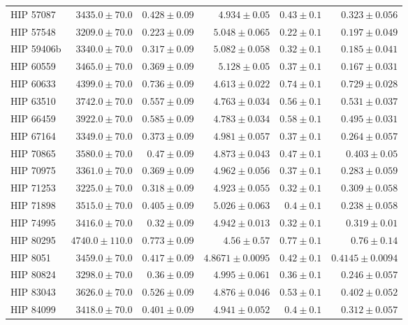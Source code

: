 \begin{longtable*}{lrrrrr}
HIP 57087 & $3435.0\pm 70.0$ & $0.428\pm 0.09$ & $4.934\pm 0.05$ & $0.43\pm 0.1$ & $0.323\pm 0.056$ \\ 
HIP 57548 & $3209.0\pm 70.0$ & $0.223\pm 0.09$ & $5.048\pm 0.065$ & $0.22\pm 0.1$ & $0.197\pm 0.049$ \\ 
HIP 59406b & $3340.0\pm 70.0$ & $0.317\pm 0.09$ & $5.082\pm 0.058$ & $0.32\pm 0.1$ & $0.185\pm 0.041$ \\ 
HIP 60559 & $3465.0\pm 70.0$ & $0.369\pm 0.09$ & $5.128\pm 0.05$ & $0.37\pm 0.1$ & $0.167\pm 0.031$ \\ 
HIP 60633 & $4399.0\pm 70.0$ & $0.736\pm 0.09$ & $4.613\pm 0.022$ & $0.74\pm 0.1$ & $0.729\pm 0.028$ \\ 
HIP 63510 & $3742.0\pm 70.0$ & $0.557\pm 0.09$ & $4.763\pm 0.034$ & $0.56\pm 0.1$ & $0.531\pm 0.037$ \\ 
HIP 66459 & $3922.0\pm 70.0$ & $0.585\pm 0.09$ & $4.783\pm 0.034$ & $0.58\pm 0.1$ & $0.495\pm 0.031$ \\ 
HIP 67164 & $3349.0\pm 70.0$ & $0.373\pm 0.09$ & $4.981\pm 0.057$ & $0.37\pm 0.1$ & $0.264\pm 0.057$ \\ 
HIP 70865 & $3580.0\pm 70.0$ & $0.47\pm 0.09$ & $4.873\pm 0.043$ & $0.47\pm 0.1$ & $0.403\pm 0.05$ \\ 
HIP 70975 & $3361.0\pm 70.0$ & $0.369\pm 0.09$ & $4.962\pm 0.056$ & $0.37\pm 0.1$ & $0.283\pm 0.059$ \\ 
HIP 71253 & $3225.0\pm 70.0$ & $0.318\pm 0.09$ & $4.923\pm 0.055$ & $0.32\pm 0.1$ & $0.309\pm 0.058$ \\ 
HIP 71898 & $3515.0\pm 70.0$ & $0.405\pm 0.09$ & $5.026\pm 0.063$ & $0.4\pm 0.1$ & $0.238\pm 0.058$ \\ 
HIP 74995 & $3416.0\pm 70.0$ & $0.32\pm 0.09$ & $4.942\pm 0.013$ & $0.32\pm 0.1$ & $0.319\pm 0.01$ \\ 
HIP 80295 & $4740.0\pm 110.0$ & $0.773\pm 0.09$ & $4.56\pm 0.57$ & $0.77\pm 0.1$ & $0.76\pm 0.14$ \\ 
HIP 8051 & $3459.0\pm 70.0$ & $0.417\pm 0.09$ & $4.8671\pm 0.0095$ & $0.42\pm 0.1$ & $0.4145\pm 0.0094$ \\ 
HIP 80824 & $3298.0\pm 70.0$ & $0.36\pm 0.09$ & $4.995\pm 0.061$ & $0.36\pm 0.1$ & $0.246\pm 0.057$ \\ 
HIP 83043 & $3626.0\pm 70.0$ & $0.526\pm 0.09$ & $4.876\pm 0.046$ & $0.53\pm 0.1$ & $0.402\pm 0.052$ \\ 
HIP 84099 & $3418.0\pm 70.0$ & $0.401\pm 0.09$ & $4.941\pm 0.052$ & $0.4\pm 0.1$ & $0.312\pm 0.057$ \\ 

\end{longtable*}
